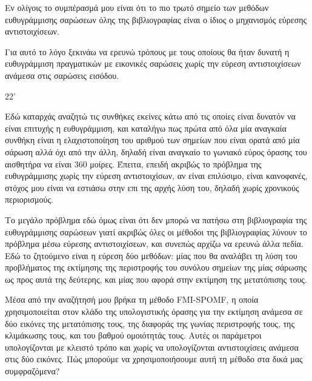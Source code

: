 \documentclass[a4paper,10pt]{article}
\begin{document}
Εν ολίγοις το συμπέρασμά μου είναι ότι το πιο τρωτό σημείο των μεθόδων
ευθυγράμμισης σαρώσεων όλης της βιβλιογραφίας είναι ο ίδιος ο μηχανισμός
εύρεσης αντιστοιχίσεων.

Για αυτό το λόγο ξεκινάω να ερευνώ τρόπους με τους οποίους θα ήταν δυνατή η
ευθυγράμμιση πραγματικών με εικονικές σαρώσεις χωρίς την εύρεση αντιστοιχίσεων
ανάμεσα στις σαρώσεις εισόδου.

22'




Εδώ καταρχάς αναζητώ τις συνθήκες εκείνες κάτω από τις οποίες είναι δυνατόν να
είναι επιτυχής η ευθυγράμμιση, και καταλήγω πως πρώτα από όλα μία αναγκαία
συνθήκη είναι η ελαχιστοποίηση του αριθμού των σημείων που είναι ορατά από μία
σάρωση αλλά όχι από την άλλη, δηλαδή είναι αναγκαίο το γωνιακό εύρος όρασης του
αισθητήρα να είναι 360 μοίρες. Έπειτα, επειδή ακριβώς το πρόβλημα της
ευθυγράμμισης χωρίς την εύρεση αντιστοιχίσων, αν είναι επιλύσιμο, είναι
καινοφανές, στόχος μου είναι να εστιάσω στην επι της αρχής λύση του, δηλαδή
χωρίς χρονικούς περιορισμούς.

Το μεγάλο πρόβλημα εδώ όμως είναι ότι δεν μπορώ να πατήσω στη βιβλιογραφία της
ευθυγράμμισης σαρώσεων γιατί ακριβώς όλες οι μέθοδοι της βιβλιογραφίας λύνουν
το πρόβλημα μέσω εύρεσης αντιστοιχίσεων, και συνεπώς αρχίζω να ερευνώ άλλα
πεδία. Εδώ το ζητούμενο είναι η εύρεση δύο μεθόδων: μίας που θα αναλάβει τη
λύση του προβλήματος της εκτίμησης της περιστροφής του συνόλου σημείων της μίας
σάρωσης ως προς αυτά της δεύτερης, και μίας που αφορά στην εκτίμηση της
μετατόπισης τους.

Μέσα από την αναζήτησή μου βρήκα τη μέθοδο FMI-SPOMF, η οποία χρησιμοποιείται
στον κλάδο της υπολογιστικής όρασης για την εκτίμηση ανάμεσα σε δύο εικόνες
της μετατόπισης τους, της διαφοράς της γωνίας περιστροφής τους, της κλιμάκωσης
τους, και του βαθμού ομοιότητάς τους. Αυτές οι παράμετροι υπολογίζονται με
κλειστό τρόπο και χωρίς να υπολογίζονται αντιστοιχίσεις ανάμεσα
στις δύο εικόνες. Πώς μπορούμε να χρησιμοποιήσουμε αυτή τη μέθοδο στα δικά μας
συμφραζόμενα?
\end{document}

